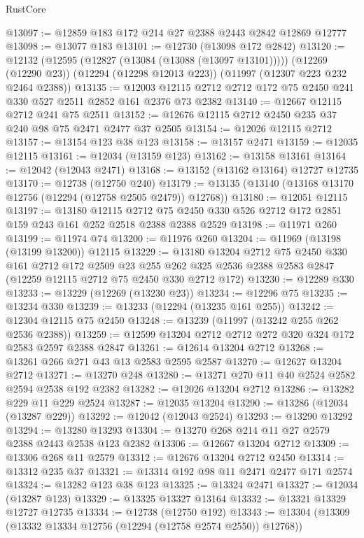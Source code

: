 \begin{lexlean}{RustCore}
\begin{coremodule}
@13097 := @12859 @183 @172 @214 @27 @2388 @2443 @2842 @12869 @12777
@13098 := @13077 @183
@13101 := @12730 (@13098 @172 @2842)
@13120 := @12132
    (@12595 (@12827 (@13084 (@13088 (@13097 @13101)))))
    (@12269 (@12290 @23))
    (@12294 (@12298 @12013 @223))
    (@11997 (@12307 @223 @232 @2464 @2388))
@13135 := @12003 @12115 @2712 @2712 @172 @75 @2450 @241 @330 @527 @2511 @2852 @161 @2376 @73 @2382
@13140 := @12667 @12115 @2712 @241 @75 @2511
@13152 := @12676 @12115 @2712 @2450 @235 @37 @240 @98 @75 @2471 @2477 @37 @2505
@13154 := @12026 @12115 @2712
@13157 := @13154 @123 @38 @123
@13158 := @13157 @2471
@13159 := @12035 @12115
@13161 := @12034 (@13159 @123)
@13162 := @13158 @13161
@13164 := @12042 (@12043 @2471)
@13168 := @13152 (@13162 @13164) @12727 @12735
@13170 := @12738 (@12750 @240)
@13179 := @13135 (@13140 (@13168 @13170 @12756 (@12294 (@12758 @2505 @2479)) @12768))
@13180 := @12051 @12115
@13197 := @13180
    @12115
    @2712
    @75
    @2450
    @330
    @526
    @2712
    @172
    @2851
    @159
    @243
    @161
    @252
    @2518
    @2388
    @2388
    @2529
@13198 := @11971 @260
@13199 := @11974 @74
@13200 := @11976 @260
@13204 := @11969 (@13198 (@13199 @13200)) @12115
@13229 := @13180
    @13204
    @2712
    @75
    @2450
    @330
    @161
    @2712
    @172
    @2509
    @23
    @255
    @262
    @325
    @2536
    @2388
    @2583
    @2847
    (@12259 @12115 @2712 @75 @2450 @330 @2712 @172)
@13230 := @12289 @330
@13233 := @13229 (@12269 (@13230 @23))
@13234 := @12296 @75
@13235 := @13234 @330
@13239 := @13233 (@12294 (@13235 @161 @255))
@13242 := @12304 @12115 @75 @2450
@13248 := @13239 (@11997 (@13242 @255 @262 @2536 @2388))
@13259 := @12599 @13204 @2712 @2712 @272 @320 @324 @172 @2583 @2597 @2388 @2847
@13261 := @12614 @13204 @2712
@13268 := @13261 @266 @271 @43 @13 @2583 @2595 @2587
@13270 := @12627 @13204 @2712
@13271 := @13270 @248
@13280 := @13271 @270 @11 @40 @2524 @2582 @2594 @2538 @192 @2382
@13282 := @12026 @13204 @2712
@13286 := @13282 @229 @11 @229 @2524
@13287 := @12035 @13204
@13290 := @13286 (@12034 (@13287 @229))
@13292 := @12042 (@12043 @2524)
@13293 := @13290 @13292
@13294 := @13280 @13293
@13304 := @13270 @268 @214 @11 @27 @2579 @2388 @2443 @2538 @123 @2382
@13306 := @12667 @13204 @2712
@13309 := @13306 @268 @11 @2579
@13312 := @12676 @13204 @2712 @2450
@13314 := @13312 @235 @37
@13321 := @13314 @192 @98 @11 @2471 @2477 @171 @2574
@13324 := @13282 @123 @38 @123
@13325 := @13324 @2471
@13327 := @12034 (@13287 @123)
@13329 := @13325 @13327 @13164
@13332 := @13321 @13329 @12727 @12735
@13334 := @12738 (@12750 @192)
@13343 := @13304 (@13309 (@13332 @13334 @12756 (@12294 (@12758 @2574 @2550)) @12768))

\end{coremodule}
\end{lexlean}
